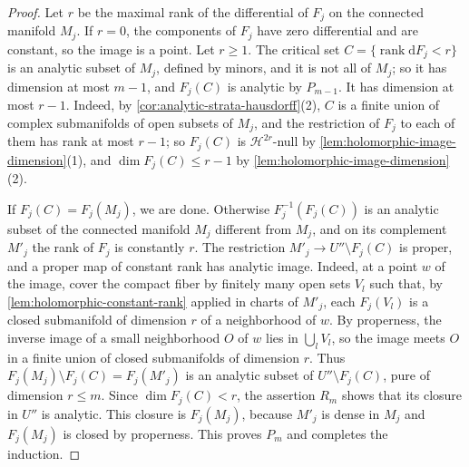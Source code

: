 \begin{proof}
Let $r$ be the maximal rank of the differential of $F_j$ on the connected manifold $M_j$. If $r=0$, the components of $F_j$ have zero differential and are constant, so the image is a point. Let $r\geq1$. The critical set $C=\{\operatorname{rank}\mathrm dF_j<r\}$ is an analytic subset of $M_j$, defined by minors, and it is not all of $M_j$; so it has dimension at most $m-1$, and $F_j(C)$ is analytic by $P_{m-1}$. It has dimension at most $r-1$. Indeed, by \cref{cor:analytic-strata-hausdorff}(2), $C$ is a finite union of complex submanifolds of open subsets of $M_j$, and the restriction of $F_j$ to each of them has rank at most $r-1$; so $F_j(C)$ is $\mathcal H^{2r}$-null by \cref{lem:holomorphic-image-dimension}(1), and $\dim F_j(C)\leq r-1$ by \cref{lem:holomorphic-image-dimension}(2).

If $F_j(C)=F_j(M_j)$, we are done. Otherwise $F_j^{-1}(F_j(C))$ is an analytic subset of the connected manifold $M_j$ different from $M_j$, and on its complement $M'_j$ the rank of $F_j$ is constantly $r$. The restriction $M'_j\to U''\setminus F_j(C)$ is proper, and a proper map of constant rank has analytic image. Indeed, at a point $w$ of the image, cover the compact fiber by finitely many open sets $V_l$ such that, by \cref{lem:holomorphic-constant-rank} applied in charts of $M'_j$, each $F_j(V_l)$ is a closed submanifold of dimension $r$ of a neighborhood of $w$. By properness, the inverse image of a small neighborhood $O$ of $w$ lies in $\bigcup_lV_l$, so the image meets $O$ in a finite union of closed submanifolds of dimension $r$. Thus $F_j(M_j)\setminus F_j(C)=F_j(M'_j)$ is an analytic subset of $U''\setminus F_j(C)$, pure of dimension $r\leq m$. Since $\dim F_j(C)<r$, the assertion $R_m$ shows that its closure in $U''$ is analytic. This closure is $F_j(M_j)$, because $M'_j$ is dense in $M_j$ and $F_j(M_j)$ is closed by properness. This proves $P_m$ and completes the induction.
\end{proof}

